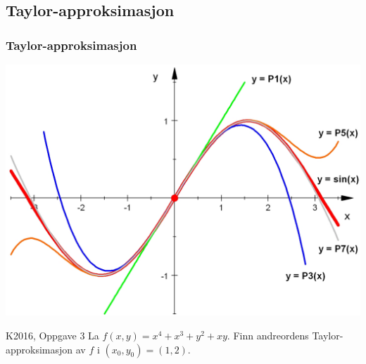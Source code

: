 \begin{frame}
  \subsection{Taylor-approksimasjon}\label{subsec:Taylor-approksimasjon}
  \frametitle{Taylor-approksimasjon}
  \centerline{\includegraphics[scale=0.3]{../img/taylor2.png}}
\end{frame}

\begin{frame}
  \begin{oppgave}{K2016, Oppgave 3}
    La $f(x,y) = x^4 + x^3 + y^2 + xy$. Finn andreordens Taylor-approksimasjon
    av $f$ i $(x_0, y_0) = (1,2)$.
  \end{oppgave} 
\end{frame}

